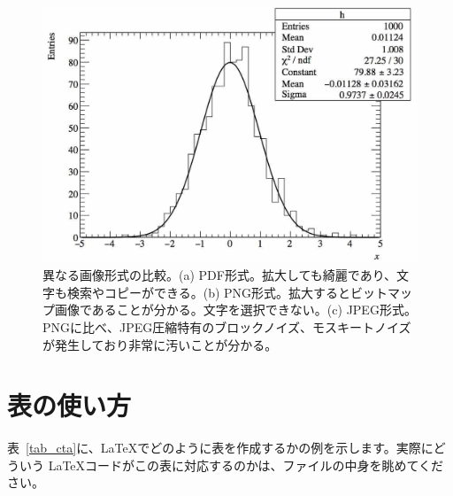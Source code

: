\begin{figure}
\begin{minipage}[b]{.3333\linewidth}
  \end{minipage}%
  \begin{minipage}[b]{.3333\linewidth}
    \centering
    \includegraphics[width=\columnwidth]{fig/histogram_jpg.jpg}
  \end{minipage}
  \caption[異なる画像形式の比較]{異なる画像形式の比較。(a) PDF形式。拡大しても綺麗であり、文字も検索やコピーができる。(b) PNG形式。拡大するとビットマップ画像であることが分かる。文字を選択できない。(c) JPEG形式。PNGに比べ、JPEG圧縮特有のブロックノイズ、モスキートノイズが発生しており非常に汚いことが分かる。}
  \label{fig_formats}
\end{figure}

\section{表の使い方}

表~\ref{tab_cta}に、\LaTeX{}でどのように表を作成するかの例を示します。実際にどういう \LaTeX{}コードがこの表に対応するのかは、ファイルの中身を眺めてください。

